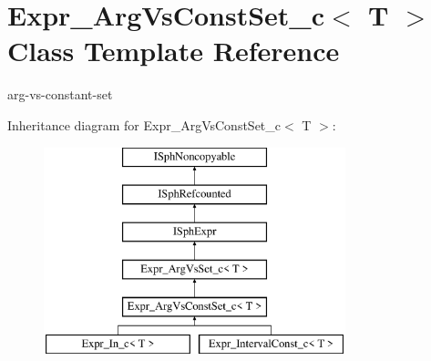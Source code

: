 \hypertarget{classExpr__ArgVsConstSet__c}{\section{Expr\-\_\-\-Arg\-Vs\-Const\-Set\-\_\-c$<$ T $>$ Class Template Reference}
\label{classExpr__ArgVsConstSet__c}
}


arg-\/vs-\/constant-\/set  


Inheritance diagram for Expr\-\_\-\-Arg\-Vs\-Const\-Set\-\_\-c$<$ T $>$\-:\begin{figure}[H]
\begin{center}
\leavevmode
\includegraphics[height=6.000000cm]{classExpr__ArgVsConstSet__c}
\end{center}
\end{figure}
